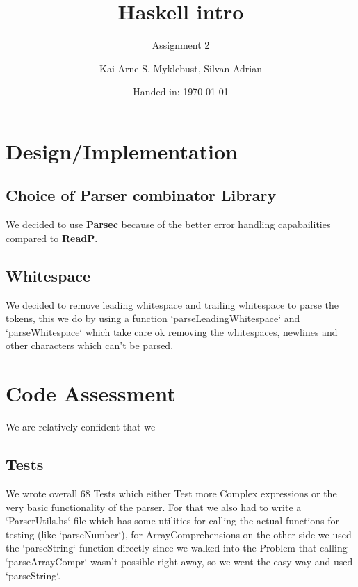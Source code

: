 \documentclass[12pt,a4paper]{article}
\begin{document}
\title{Haskell intro}
\subtitle{Assignment 2}

\author{Kai Arne S. Myklebust, Silvan Adrian}
\date{Handed in: \today}
	
\maketitle
\tableofcontents

\section{Design/Implementation}


\subsection{Choice of Parser combinator Library}
We decided to use \textbf{Parsec} because of the better error handling capabailities compared to \textbf{ReadP}.

\subsection{Whitespace}
We decided to remove leading whitespace and trailing whitespace to parse the tokens, this we do by using a function `parseLeadingWhitespace` and `parseWhitespace` which take care ok removing the whitespaces, newlines and other characters which can't be parsed.

\subsection{}

\section{Code Assessment}

We are relatively confident that we

\subsection{Tests}

We wrote overall 68 Tests which either Test more Complex expressions or the very basic functionality of the parser.
For that we also had to write a `ParserUtils.hs` file which has some utilities for calling the actual functions for testing (like `parseNumber`), for ArrayComprehensions on the other side we used the `parseString` function directly since we walked into the Problem that calling `parseArrayCompr` wasn't possible right away, so we went the easy way and used `parseString`.
\end{document}
